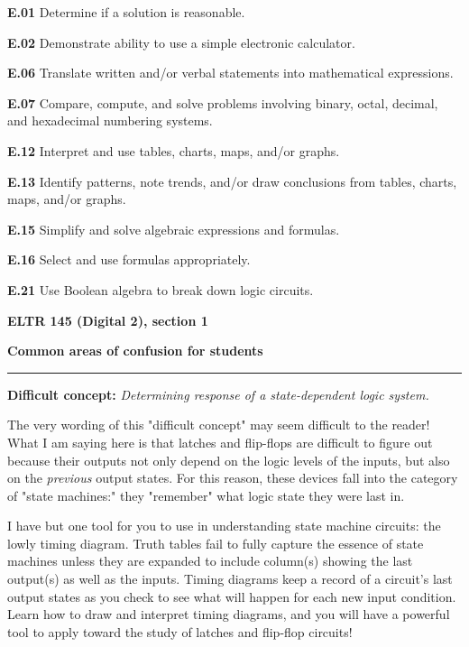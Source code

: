 \item{\bf E.01} Determine if a solution is reasonable.
\item{\bf E.02} Demonstrate ability to use a simple electronic calculator.
\item{\bf E.06} Translate written and/or verbal statements into mathematical expressions.
\item{\bf E.07} Compare, compute, and solve problems involving binary, octal, decimal, and hexadecimal numbering systems.
\item{\bf E.12} Interpret and use tables, charts, maps, and/or graphs.
\item{\bf E.13} Identify patterns, note trends, and/or draw conclusions from tables, charts, maps, and/or graphs.
\item{\bf E.15} Simplify and solve algebraic expressions and formulas.
\item{\bf E.16} Select and use formulas appropriately.
\item{\bf E.21} Use Boolean algebra to break down logic circuits.
\medskip





\vfil \eject

\centerline{\bf ELTR 145 (Digital 2), section 1} \bigskip 
 
\vskip 10pt

\noindent
{\bf Common areas of confusion for students}

\vskip 5pt

\hrule \vskip 5pt

\vskip 10pt

\noindent
{\bf Difficult concept: } {\it Determining response of a state-dependent logic system.}

The very wording of this "difficult concept" may seem difficult to the reader!  What I am saying here is that latches and flip-flops are difficult to figure out because their outputs not only depend on the logic levels of the inputs, but also on the {\it previous} output states.  For this reason, these devices fall into the category of "state machines:" they "remember" what logic state they were last in.

I have but one tool for you to use in understanding state machine circuits: the lowly timing diagram.  Truth tables fail to fully capture the essence of state machines unless they are expanded to include column(s) showing the last output(s) as well as the inputs.  Timing diagrams keep a record of a circuit's last output states as you check to see what will happen for each new input condition.  Learn how to draw and interpret timing diagrams, and you will have a powerful tool to apply toward the study of latches and flip-flop circuits!

